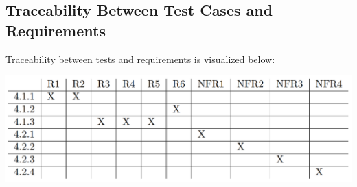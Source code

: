 \documentclass[12pt, titlepage]{article}
\begin{document}
\subsection{Traceability Between Test Cases and Requirements} \label{trac_matrix}
Traceability between tests and requirements is visualized below:
\begin{center}
  \includegraphics[scale=0.4]{TraceabilityMatrix.PNG}
\end{center}










\newpage
\end{document}
